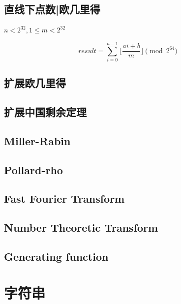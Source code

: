 \documentclass{article}
\begin{document}
\subsection{直线下点数|欧几里得}

$n < 2 ^ {32}, 1 \leq m < 2 ^ {32}$

$$
result=\sum_{i=0}^{n-1} \lfloor \frac{ai + b}{m} \rfloor \pmod{2^{64}}
$$


\newpage

\subsection{扩展欧几里得}


\subsection{扩展中国剩余定理}

\newpage


\subsection{Miller-Rabin}

\newpage

\subsection{Pollard-rho}

\newpage

\subsection{Fast Fourier Transform}

\newpage

\subsection{Number Theoretic Transform}

\newpage

\subsection{Generating function}

\newpage

\section{字符串}
\end{document}
